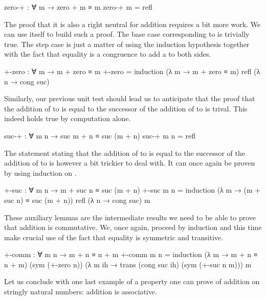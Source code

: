 \documentclass[twocolumn]{article}
\begin{document}
\begin{code}
zero-+ : ∀ m → zero + m ≡ m
zero-+ m = refl
\end{code}

The proof that it is also a right neutral for addition requires a bit more
work. We can use  itself to build such a proof. The base case
corresponding to { \AF{+}   } is trivially
true. The step case is just a matter of using the induction hypothesis together
with the fact that equality is a congruence to add a  to both sides.

\begin{code}
+-zero : ∀ m → m + zero ≡ m
+-zero =
  induction
    (λ m → m + zero ≡ m)
    refl
    (λ n → cong suc)
\end{code}

Similarly, our previous unit test should lead us to anticipate that the
proof that the addition of   to  is equal to the
successor of the addition of  to  is trival. This indeed holds
true by computation alone.

\begin{code}
suc-+ : ∀ m n → suc m + n ≡ suc (m + n)
suc-+ m n = refl
\end{code}

The statement stating that the addition of  to   is
equal to the successor of the addition of  to  is however a bit
trickier to deal with. It can once again be proven by using induction on .

\begin{code}
+-suc : ∀ m n → m + suc n ≡ suc (m + n)
+-suc m n =
  induction
    (λ m → (m + suc n) ≡ suc (m + n))
    refl
    (λ n → cong suc)
    m
\end{code}

These auxiliary lemmas are the intermediate results we need to be able to
prove that addition is commutative. We, once again, proceed by induction
and this time make crucial use of the fact that equality is symmetric and
transitive.

\begin{code}
+-comm : ∀ m n → m + n ≡ n + m
+-comm m n =
  induction
    (λ m → m + n ≡ n + m)
    (sym (+-zero n))
    (λ m ih → trans (cong suc ih) (sym (+-suc n m)))
    m
\end{code}

Let us conclude with one last example of a property one can prove of addition
on stringly natural numbers: addition is associative.
\end{document}
